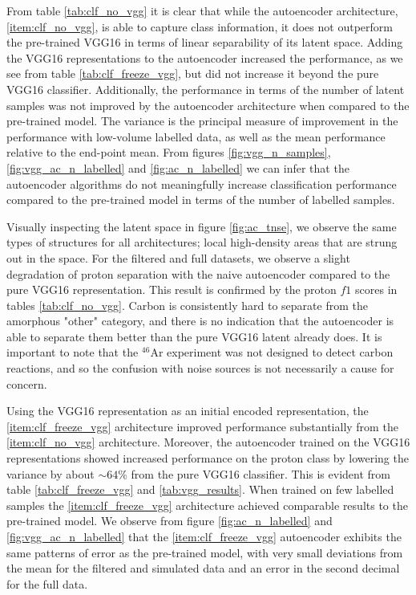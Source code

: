 From table \ref{tab:clf_no_vgg} it is clear that while the autoencoder architecture, \ref{item:clf_no_vgg}, is able to capture class information, it does not outperform the pre-trained VGG16 in terms of linear separability of its latent space. Adding the VGG16 representations to the autoencoder increased the performance, as we see from table \ref{tab:clf_freeze_vgg}, but did not increase it beyond the pure VGG16 classifier.  Additionally, the performance in terms of the number of latent samples was not improved by the autoencoder architecture when compared to the pre-trained model. The variance is the principal measure of improvement in the performance with low-volume labelled data, as well as the mean performance relative to the end-point mean. From figures \ref{fig:vgg_n_samples}, \ref{fig:vgg_ac_n_labelled}  and \ref{fig:ac_n_labelled} we can infer that the autoencoder algorithms do not meaningfully increase classification performance compared to the pre-trained model in terms of the number of labelled samples.

Visually inspecting the latent space in figure \ref{fig:ac_tnse}, we observe the same types of structures for all architectures; local high-density areas that are strung out in the space. For the filtered and full datasets, we observe a slight degradation of proton separation with the naive autoencoder compared to the pure VGG16 representation. This result is confirmed by the proton $f1$ scores in tables \ref{tab:clf_no_vgg}. Carbon is consistently hard to separate from the amorphous "other" category, and there is no indication that the autoencoder is able to separate them better than the pure VGG16 latent already does. It is important to note that the ${}^{46}$Ar experiment was not designed to detect carbon reactions, and so the confusion with noise sources is not necessarily a cause for concern. 

Using the VGG16 representation as an initial encoded representation, the \ref{item:clf_freeze_vgg} architecture improved performance substantially from the \ref{item:clf_no_vgg} architecture. Moreover, the autoencoder trained on the VGG16 representations showed increased performance on the proton class by lowering the variance by about $\sim 64\%$ from the pure VGG16 classifier. This is evident from table \ref{tab:clf_freeze_vgg} and \ref{tab:vgg_results}. When trained on few labelled samples the \ref{item:clf_freeze_vgg} architecture achieved comparable results to the pre-trained model. We observe from figure \ref{fig:ac_n_labelled} and \ref{fig:vgg_ac_n_labelled} that the \ref{item:clf_freeze_vgg} autoencoder exhibits the same patterns of error as the pre-trained model, with very small deviations from the mean for the filtered and simulated data and an error in the second decimal for the full data.

